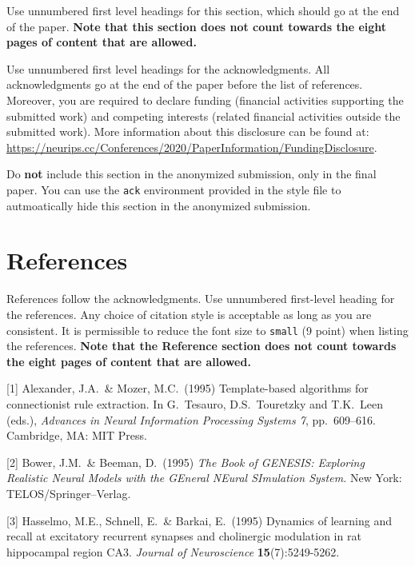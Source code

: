 \documentclass{article}
\theoremstyle{definition}
\begin{document}
Use unnumbered first level headings for this section, which should go at the end of the paper. {\bf Note that this section does not count towards the eight pages of content that are allowed.}

\begin{ack}
Use unnumbered first level headings for the acknowledgments. All acknowledgments
go at the end of the paper before the list of references. Moreover, you are required to declare 
funding (financial activities supporting the submitted work) and competing interests (related financial activities outside the submitted work). 
More information about this disclosure can be found at: \url{https://neurips.cc/Conferences/2020/PaperInformation/FundingDisclosure}.


Do {\bf not} include this section in the anonymized submission, only in the final paper. You can use the \texttt{ack} environment provided in the style file to autmoatically hide this section in the anonymized submission.
\end{ack}

\section*{References}

References follow the acknowledgments. Use unnumbered first-level heading for
the references. Any choice of citation style is acceptable as long as you are
consistent. It is permissible to reduce the font size to \verb+small+ (9 point)
when listing the references.
{\bf Note that the Reference section does not count towards the eight pages of content that are allowed.}
\medskip

\small

[1] Alexander, J.A.\ \& Mozer, M.C.\ (1995) Template-based algorithms for
connectionist rule extraction. In G.\ Tesauro, D.S.\ Touretzky and T.K.\ Leen
(eds.), {\it Advances in Neural Information Processing Systems 7},
pp.\ 609--616. Cambridge, MA: MIT Press.

[2] Bower, J.M.\ \& Beeman, D.\ (1995) {\it The Book of GENESIS: Exploring
  Realistic Neural Models with the GEneral NEural SImulation System.}  New York:
TELOS/Springer--Verlag.

[3] Hasselmo, M.E., Schnell, E.\ \& Barkai, E.\ (1995) Dynamics of learning and
recall at excitatory recurrent synapses and cholinergic modulation in rat
hippocampal region CA3. {\it Journal of Neuroscience} {\bf 15}(7):5249-5262.
\end{document}
